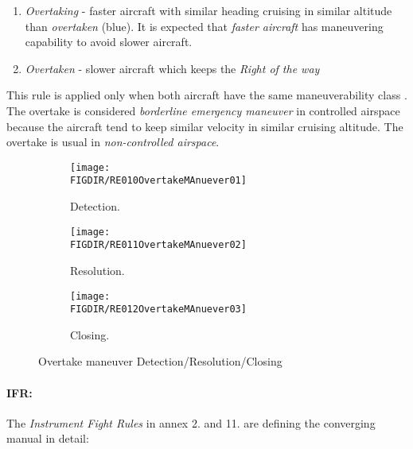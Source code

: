 \begin{enumerate}
    \item \emph{Overtaking} - faster aircraft with similar heading cruising in similar altitude than \emph{overtaken} (blue). It is expected that \emph{faster aircraft} has maneuvering capability to avoid slower aircraft.
    
    \item \emph{Overtaken} - slower aircraft which keeps the \emph{Right of the way}
\end{enumerate}

\begin{note}
    This rule is applied only when both aircraft have the same maneuverability class \cite{icaoAnnex2}. The overtake is considered \emph{borderline emergency maneuver} in controlled airspace because the aircraft tend to keep similar velocity in similar cruising altitude. The overtake is usual in \emph{non-controlled airspace}.
\end{note}

\begin{figure}[H]
	\centering
    \begin{subfigure}{0.32\textwidth}
        \texttt{[image: \\FIGDIR/RE010OvertakeMAnuever01]} 
        \caption{Detection.}
        \label{fig:OvertakeManeuverTheoreticalDetection}
    \end{subfigure}
    \begin{subfigure}{0.32\textwidth}
        \texttt{[image: \\FIGDIR/RE011OvertakeMAnuever02]} 
        \caption{Resolution.}
        \label{fig:OvertakeManeuverTheoreticalResolution}
    \end{subfigure}
    \begin{subfigure}{0.32\textwidth}
        \texttt{[image: \\FIGDIR/RE012OvertakeMAnuever03]} 
        \caption{Closing.}
        \label{fig:OvertakeManeuverTheoreticalClosure}
    \end{subfigure}
    \caption{Overtake maneuver Detection/Resolution/Closing}
    \label{fig:OvertakeManeuverTheoretical}
\end{figure}

\paragraph{IFR:} The \emph{Instrument Fight Rules} in annex 2. \cite{icaoAnnex2} and 11. \cite{icaoAnnex11} are defining the converging manual in detail:

